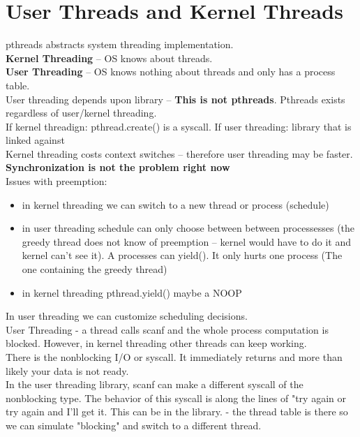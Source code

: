 \documentclass[../base_file/cs1550_notes.tex]{subfiles}
\begin{document}
\section{User Threads and Kernel Threads} 
pthreads abstracts system threading implementation.\\
\textbf{Kernel Threading} -- OS knows about threads.\\
\textbf{User Threading} -- OS knows nothing about threads and only has a process table.\\
User threading depends upon library -- \textbf{This is not pthreads}\@. Pthreads exists
regardless of user/kernel threading.\\

If kernel threadign: pthread.create() is a syscall.
If user threading: library that is linked against\\

Kernel threading costs context switches -- therefore user threading may be faster.\\

\textbf{Synchronization is not the problem right now}\\

Issues with preemption:
	\begin{itemize}
	\item in kernel threading we can switch to a new thread or process (schedule)
	\item in user threading schedule can only choose between between processesses
			(the greedy thread does not know of preemption -- kernel would have to do it 
			 and kernel can't see it).  A processes can yield().  It only hurts one 
			process (The one containing the greedy thread)
	\item in kernel threading pthread.yield() maybe a NOOP
	\end{itemize}

In user threading we can customize scheduling decisions.\\

 User Threading - a thread calls scanf and the whole process computation is blocked.
 However, in kernel threading other threads can keep working.\\

There is the nonblocking I/O or syscall.  It immediately returns and more than likely
your data is not ready.\\

In the user threading library, scanf can make a different syscall of the nonblocking
type.  The behavior of this syscall is along the lines of "try again or try again and 
I'll get it.  This can be in the library.  - the thread table is there so we can 
simulate "blocking" and switch to a different thread.\\
\end{document}
